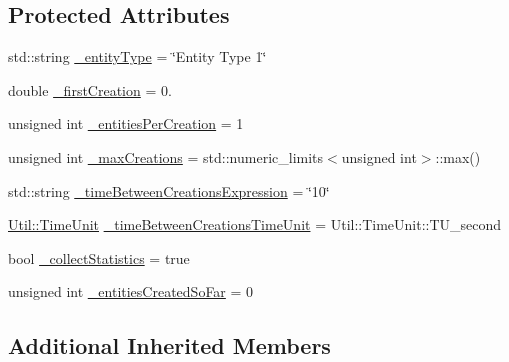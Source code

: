 \subsection*{Protected Attributes}
\begin{DoxyCompactItemize}
\item 
std\-::string \hyperlink{class_source_model_component_ad001e8ae30c828916f271ac72c7817d1}{\-\_\-entity\-Type} = \char`\"{}Entity Type 1\char`\"{}
\item 
double \hyperlink{class_source_model_component_ad58dddde2b6a81d85f261fa8a11243b3}{\-\_\-first\-Creation} = 0.
\item 
unsigned int \hyperlink{class_source_model_component_a68b0576903281a4716eb3ea0281dd133}{\-\_\-entities\-Per\-Creation} = 1
\item 
unsigned int \hyperlink{class_source_model_component_a99525d31bdc32efd5bbdcfbbbf115ec5}{\-\_\-max\-Creations} = std\-::numeric\-\_\-limits$<$unsigned int$>$\-::max()
\item 
std\-::string \hyperlink{class_source_model_component_ab0c96af4d61d8125773fa41cff865211}{\-\_\-time\-Between\-Creations\-Expression} = \char`\"{}10\char`\"{}
\item 
\hyperlink{class_util_aadbd82055afeaa7d4fb4da513de628ff}{Util\-::\-Time\-Unit} \hyperlink{class_source_model_component_af34df20551bc223eb103ca87e9f1463e}{\-\_\-time\-Between\-Creations\-Time\-Unit} = Util\-::\-Time\-Unit\-::\-T\-U\-\_\-second
\item 
bool \hyperlink{class_source_model_component_ac0c009ff9a2e8169d251118dabcd19eb}{\-\_\-collect\-Statistics} = true
\item 
unsigned int \hyperlink{class_source_model_component_af1f4fb38d2c0c4ac08235d7aec131bc9}{\-\_\-entities\-Created\-So\-Far} = 0
\end{DoxyCompactItemize}
\subsection*{Additional Inherited Members}


